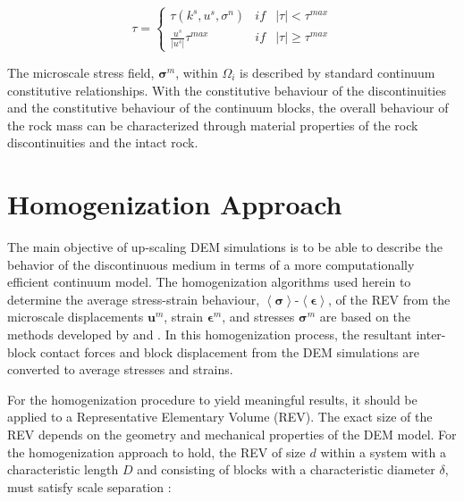 \begin{equation}
\tau=\left\{\begin{matrix}
\tau\left(k^s,u^s, \sigma^n\right) &if&\left |\tau \right | < \tau^{max}\\ 
\frac{u^s}{\left|u^s\right|}\tau^{max} & if &\left |\tau \right | \geq \tau^{max}
\end{matrix}\right.
\label{eqn:demshear}
\end{equation}

The microscale stress field, $\boldsymbol{\sigma}^m$, within $\Omega_i$ is described by standard continuum constitutive relationships. With the constitutive behaviour of the discontinuities and the constitutive behaviour of the continuum blocks, the overall behaviour of the rock mass can be characterized through material properties of the rock discontinuities and the intact rock.

\section{Homogenization Approach}

The main objective of up-scaling DEM simulations is to be able to describe the  behavior of the discontinuous medium in terms of a more computationally efficient continuum model. The homogenization algorithms used herein to determine the average stress-strain behaviour, $\left<\boldsymbol{\sigma}\right>$-$\left<\boldsymbol{\epsilon}\right>$, of the REV from the microscale displacements $\mathbf{u}^m$, strain $\boldsymbol{\epsilon}^m$, and stresses $\boldsymbol{\sigma}^m$ are based on the methods developed by \citet{daddetta_particle_2004} and \citet{wellmann_homogenization_2008}. In this homogenization process, the resultant inter-block contact forces and block displacement from the DEM simulations are converted to average stresses and strains.

For the homogenization procedure to yield meaningful results, it should be applied to a Representative Elementary Volume (REV). The exact size of the REV depends on the geometry and mechanical properties of the DEM model. For the homogenization approach to hold, the REV of size $d$ within a system with a characteristic length $D$ and consisting of blocks with a characteristic diameter $\delta$, must satisfy scale separation \citep{wellmann_homogenization_2008}:
 
